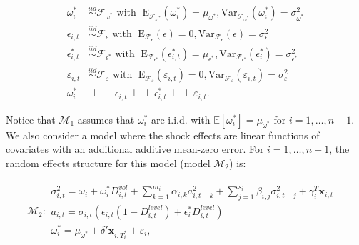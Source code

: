 \documentclass[11pt]{article}
\newcommand{\x}{\textbf{x}}
\def\mbf#1{\mathbf{#1}} %
\newcommand{\simiid}{\stackrel{iid}{\sim}} %
\newcommand{\indep}{\perp \!\!\! \perp } %
\def\mrm#1{\mathrm{#1}} %
\def\mc#1{\mathcal{#1}} %
\def\E{\mathbb{E}} %
\def\mc#1{\mathcal{#1}}
\theoremstyle{definition}
\begin{document}
\begin{align*}
  \omega^{*}_i &\simiid \mc{F}_{\omega^{*}} \text{ with }  \; \mrm{E}_{\mc{F}_{\omega^{*}}}(\omega^{*}_i) = \mu_{\omega^{*}}, \mrm{Var}_{\mc{F}_{\omega^{*}}}(\omega^{*}_i)  = \sigma^2_{\omega^{*}}  \\
  \epsilon_{i,t} &\simiid \mc{F}_{\epsilon} \text{ with }  \; \mrm{E}_{\mc{F}_{\epsilon}}(\epsilon) = 0, \mrm{Var}_{\mc{F}_{\epsilon}}(\epsilon)  = \sigma^2_{\epsilon}  \\
  \epsilon^{*}_{i,t} &\simiid \mc{F}_{\epsilon^{*}} \text{ with }  \; \mrm{E}_{\mc{F}_{\epsilon^{*}}}(\epsilon^{*}_{i,t}) = \mu_{\epsilon^{*}}, \mrm{Var}_{\mc{F}_{\epsilon^{*}}}(\epsilon^{*}_i)  = \sigma^2_{\epsilon^{*}}  \\
  \varepsilon_{i,t} & \simiid  \mc{F}_{\varepsilon} \text{ with }  \; \mrm{E}_{\mc{F}_{\varepsilon}}(\varepsilon_{i,t}) = 0, \mrm{Var}_{\mc{F}_{\varepsilon}}(\varepsilon_{i,t}) = \sigma^2_{\varepsilon} \\
  \omega^{*}_{i} &\indep \epsilon_{i,t} \indep \epsilon^{*}_{i,t}  \indep \varepsilon_{i,t}.
  \end{align*}

Notice that $\mc{M}_1$ assumes that $\omega^{*}_i$ are i.i.d. with $\E[ \omega^{*}_i]=\mu_{\omega^{*}}$ for $i = 1, \ldots, n+1$. We also consider a model where the shock effects are linear functions of covariates with an additional additive mean-zero error. For $i = 1, \ldots, n+1$, the random effects structure for this model (model $\mc{M}_2$) is:

\begin{align*}
  \mc{M}_2 \colon \begin{array}{l}
     \sigma^{2}_{i,t} = \omega_{i} + \omega^{*}_i D^{vol}_{i,t} + \sum^{m_{i}}_{k=1}\alpha_{i,k}a^{2}_{i,t-k} + \sum_{j=1}^{s_{i}}\beta_{i,j}\sigma_{i,t-j}^{2} + \gamma_{i}^{T} \x_{i,t} \text{ }\\[.2cm]
     a_{i,t} = \sigma_{i,t}(\epsilon_{i,t}(1-D^{level}_{i,t}) + \epsilon^{*}_{i}D^{level}_{i,t})\\[.2cm]
     \omega_i^{*} = \mu_{\omega^{*}}+\delta'\mbf{x}_{i, T_i^*}+ \varepsilon_{i},
  \end{array}
  \end{align*}
\end{document}
